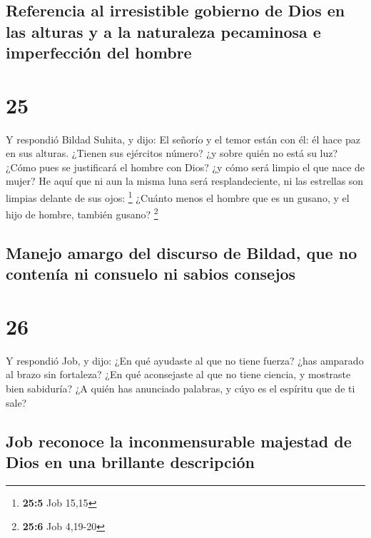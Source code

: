 \hypertarget{referencia-al-irresistible-gobierno-de-dios-en-las-alturas-y-a-la-naturaleza-pecaminosa-e-imperfecciuxf3n-del-hombre}{%
\subsection{Referencia al irresistible gobierno de Dios en las alturas y
a la naturaleza pecaminosa e imperfección del
hombre}\label{referencia-al-irresistible-gobierno-de-dios-en-las-alturas-y-a-la-naturaleza-pecaminosa-e-imperfecciuxf3n-del-hombre}}

\hypertarget{section-24}{%
\section{25}\label{section-24}}

 Y respondió Bildad Suhita, y dijo:  El
señorío y el temor están con él: él hace paz en sus alturas.
 ¿Tienen sus ejércitos número? ¿y sobre quién no está su
luz?  ¿Cómo pues se justificará el hombre con Dios? ¿y
cómo será limpio el que nace de mujer?  He aquí que ni aun
la misma luna será resplandeciente, ni las estrellas son limpias delante
de sus ojos: \footnote{\textbf{25:5} Job 15,15}  ¿Cuánto
menos el hombre que es un gusano, y el hijo de hombre, también gusano?
\footnote{\textbf{25:6} Job 4,19-20}

\hypertarget{manejo-amargo-del-discurso-de-bildad-que-no-contenuxeda-ni-consuelo-ni-sabios-consejos}{%
\subsection{Manejo amargo del discurso de Bildad, que no contenía ni
consuelo ni sabios
consejos}\label{manejo-amargo-del-discurso-de-bildad-que-no-contenuxeda-ni-consuelo-ni-sabios-consejos}}

\hypertarget{section-25}{%
\section{26}\label{section-25}}

 Y respondió Job, y dijo:  ¿En qué ayudaste
al que no tiene fuerza? ¿has amparado al brazo sin fortaleza?
 ¿En qué aconsejaste al que no tiene ciencia, y mostraste
bien sabiduría?  ¿A quién has anunciado palabras, y cúyo
es el espíritu que de ti sale?

\hypertarget{job-reconoce-la-inconmensurable-majestad-de-dios-en-una-brillante-descripciuxf3n}{%
\subsection{Job reconoce la inconmensurable majestad de Dios en una
brillante
descripción}\label{job-reconoce-la-inconmensurable-majestad-de-dios-en-una-brillante-descripciuxf3n}}

